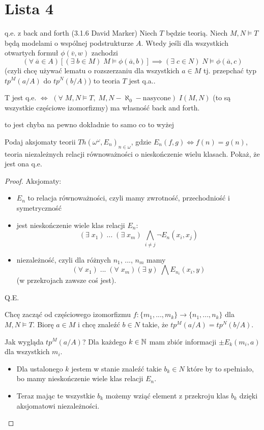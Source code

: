 \section{Lista 4}

\setcounter{zadanie}{0}

\begin{lemma}{q.e. z back and forth (3.1.6 David Marker)}{}
  Niech $T$ będzie teorią. Niech $M,N\models T$ będą modelami o wspólnej podstrukturze $A$. Wtedy jeśli dla wszystkich otwartych formuł $\phi(\overline{v}, w)$ zachodzi
  $$(\forall\;\overline{a}\in A)[(\exists\;b\in M)\;M\models \phi(\overline{a}, b)]\implies (\exists\;c\in N)\;N\models\phi(\overline{a}, c)$$
  (czyli chcę używać lematu o rozszerzaniu dla wszystkich $a\in M$ tj. przepchać typ $tp^M(a/A)$ do $tp^N(b/A)$) to teoria $T$ jest q.a..
\end{lemma}

\begin{lemma}{}{}
  T jest q.e. $\iff$ $(\forall\;M,N\models T,\;M,N-\aleph_0-\text{nasycone})\;I(M,N)$ (to są wszystkie częściowe izomorfizmy) ma własność back and forth.
\end{lemma}

to jest chyba na pewno dokładnie to samo co to wyżej

\begin{zadanie}
  Podaj aksjomaty teorii $Th(\omega^\omega, E_n)_{n\in\omega}$, gdzie $E_n(f,g)\iff f(n)=g(n)$, teoria niezależnych relacji równoważności o nieskończenie wielu klasach. Pokaż, że jest ona q.e.
\end{zadanie}

\begin{proof}
  Aksjomaty:
  \begin{itemize}
    \item $E_n$ to relacja równoważności, czyli mamy zwrotność, przechodniość i symetryczność
    \item jest nieskończenie wiele klas relacji $E_n$: 
      $$(\exists\;x_1)\;...\;(\exists\;x_m)\;\bigwedge_{i\neq j} \neg E_n(x_i, x_j)$$
    \item niezależność, czyli dla różnych $n_1$, ..., $n_m$ mamy
      $$(\forall\;x_1)\;...\;(\forall\;x_m)(\exists\;y)\;\bigwedge E_{n_i}(x_i, y)$$
      (w przekrojach zawsze coś jest).
  \end{itemize}

  Q.E.

  Chcę zacząć od częściowego izomorfizmu $f:\{m_1,...,m_k\}\to \{n_1,...,n_k\}$ dla $M,N\models T$. Biorę $a\in M$ i chcę znaleźć $b\in N$ takie, że $tp^M(a/A)=tp^N(b/A)$.

  Jak wygląda $tp^M(a/A)$? Dla każdego $k\in \mathbb{N}$ mam zbiór informacji $\pm E_k(m_i, a)$ dla wszystkich $m_i$. 
  \begin{itemize}
    \item Dla ustalonego $k$ jestem w stanie znaleźć takie $b_k\in N$ które by to spełniało, bo mamy nieskończenie wiele klas relacji $E_n$. 
    \item Teraz mając te wszystkie $b_k$ możemy wziąć element z przekroju klas $b_k$ dzięki aksjomatowi niezależności.
  \end{itemize}
\end{proof}

